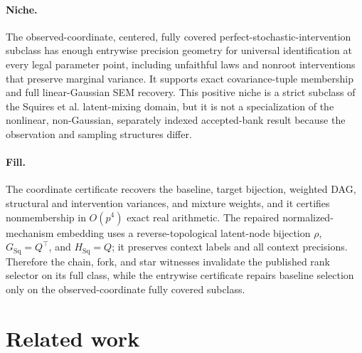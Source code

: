 \documentclass{article}
\begin{document}
\paragraph{Niche.} The observed-coordinate, centered, fully covered perfect-stochastic-intervention subclass has enough entrywise precision geometry for universal identification at every legal parameter point, including unfaithful laws and nonroot interventions that preserve marginal variance. It supports exact covariance-tuple membership and full linear-Gaussian SEM recovery. This positive niche is a strict subclass of the Squires et al. latent-mixing domain, but it is not a specialization of the nonlinear, non-Gaussian, separately indexed accepted-bank result because the observation and sampling structures differ.

\paragraph{Fill.} The coordinate certificate recovers the baseline, target bijection, weighted DAG, structural and intervention variances, and mixture weights, and it certifies nonmembership in \(O(p^4)\) exact real arithmetic. The repaired normalized-mechanism embedding uses a reverse-topological latent-node bijection \(\rho\), \(G_{\mathrm{Sq}}=Q^{\top}\), and \(H_{\mathrm{Sq}}=Q\); it preserves context labels and all context precisions. Therefore the chain, fork, and star witnesses invalidate the published rank selector on its full class, while the entrywise certificate repairs baseline selection only on the observed-coordinate fully covered subclass.

\section{Related work}
\end{document}
